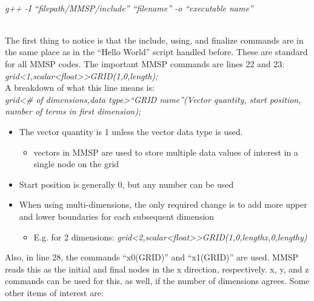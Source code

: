 \documentclass{article}
\begin{document}
\\	\textit{g++ -I “filepath/MMSP/include” “filename” -o “executable name”}

\\The first thing to notice is that the include, using, and finalize commands are in the same place as in the “Hello World” script handled before.  These are standard for all MMSP codes.  The important MMSP commands are lines 22 and 23:
\\ 	\textit{grid\textless 1,scalar\textless float\textgreater \textgreater GRID(1,0,length);}
\\A breakdown of what this line means is:
\\ 	\textit{grid\textless \# of dimensions,data type\textgreater “GRID name”(Vector quantity, start position, number of terms in first dimension);}
\\ \begin{itemize} \itemsep1pt \parskip0pt 
\item The vector quantity is 1 unless the vector data type is used.
\begin{itemize} \itemsep1pt \parskip0pt 
\item vectors in MMSP are used to store multiple data values of interest in a single node on the grid
\end{itemize}
\item Start position is generally 0, but any number can be used
\item When using multi-dimensions, the only required change is to add more upper and lower boundaries for each subsequent dimension
\begin{itemize} \itemsep1pt \parskip0pt 
\item E.g. for 2 dimensions: \textit{grid\textless 2,scalar\textless float\textgreater \textgreater GRID(1,0,lengthx,0,lengthy)}
\end{itemize}
\end{itemize}
Also, in line 28, the commands “x0(GRID)” and “x1(GRID)” are used. MMSP reads this as the initial and final nodes in the x direction, respectively. x, y, and z commands can be used for this, as well, if the number of dimensions agrees.
Some other items of interest are:
\end{document}

